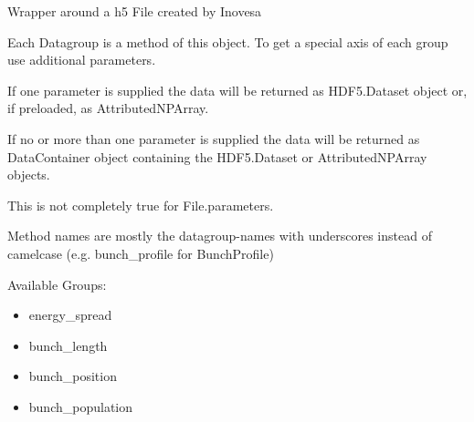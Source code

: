 \documentclass[letterpaper,10pt,openany,oneside,english]{sphinxmanual}
\begin{document}

\begin{fulllineitems}
\label{\detokenize{file:file.File}}
Wrapper around a h5 File created by Inovesa

Each Datagroup is a method of this object. To get a special axis of each group use additional parameters.

If one parameter is supplied the data will be returned as HDF5.Dataset object or, if preloaded, as AttributedNPArray.

If no or more than one parameter is supplied the data will be returned as DataContainer object containing  
the HDF5.Dataset or AttributedNPArray objects.

This is not completely true for File.parameters.

\begin{sphinxVerbatim}[commandchars=\\\{\}]
    
    
    
    
    
     
\end{sphinxVerbatim}

Method names are mostly the datagroup-names with underscores instead of camelcase (e.g. bunch\_profile for BunchProfile)

Available Groups:
\begin{itemize}
\item {} 
energy\_spread

\item {} 
bunch\_length

\item {} 
bunch\_position

\item {} 
bunch\_population


\end{itemize}
\end{fulllineitems}
\end{document}
